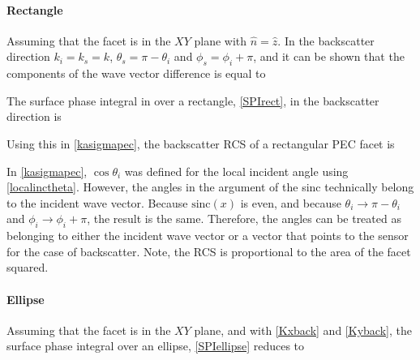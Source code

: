 %
%

\paragraph{Rectangle} Assuming that the facet is in the $XY$ plane with $\hat{n} = \hat{z}$. In the backscatter direction $k_i = k_s = k$, $\theta_s = \pi - \theta_i$ and $\phi_s = \phi_i + \pi$, and it can be shown that the components of the wave vector difference is equal to 

The surface phase integral in over a rectangle, \eqref{SPIrect}, in the backscatter direction is 

Using this in \eqref{kasigmapec}, the backscatter RCS of a  rectangular PEC facet is 
 
In \eqref{kasigmapec}, $\cos\theta_i$ was defined for the local incident angle using \eqref{localinctheta}. However, the angles in the argument of the sinc technically belong to the incident wave vector. Because $\textrm{sinc}(x)$ is even, and because $\theta_i \rightarrow \pi - \theta_i$ and $\phi_i \rightarrow \phi_i + \pi$, the result is the same. Therefore, the angles can be treated as belonging to either the incident wave vector or a vector that points to the sensor for the case of backscatter. Note, the RCS is proportional to the area of the facet squared.

\paragraph{Ellipse} 
Assuming that the facet is in the $XY$ plane, and with \eqref{Kxback} and \eqref{Kyback}, the surface phase integral over an ellipse, \eqref{SPIellipse} reduces to 

